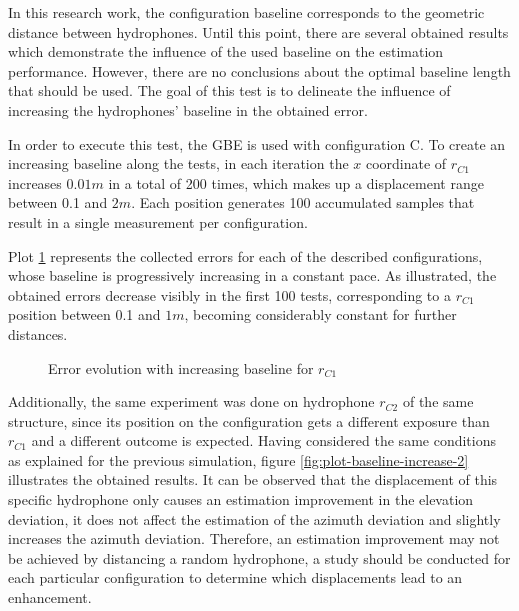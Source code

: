 In this research work, the configuration baseline corresponds to the geometric distance between hydrophones. Until this point, there are several obtained results which demonstrate the influence of the used baseline on the estimation performance. However, there are no conclusions about the optimal baseline length that should be used. The goal of this test is to delineate the influence of increasing the hydrophones' baseline in the obtained error. 

In order to execute this test, the GBE is used with configuration C. To create an increasing baseline along the tests, in each iteration the $x$ coordinate of $r_{C1}$ increases $0.01 m$ in a total of 200 times, which makes up a displacement range between 0.1 and $2 m$. Each position generates 100 accumulated samples that result in a single measurement per configuration. 

Plot \ref{fig:plot-baseline-increase-1} represents the collected errors for each of the described configurations, whose baseline is progressively increasing in a constant pace. As illustrated, the obtained errors decrease visibly in the first 100 tests, corresponding to a $r_{C1}$ position between 0.1 and $1 m$, becoming considerably constant for further distances.

\begin{figure}[!htbp]
	\captionsetup{justification=centering,margin=2cm}
	\caption{Error evolution with increasing baseline for $r_{C1}$}
	\label{fig:plot-baseline-increase-1}
\end{figure}

Additionally, the same experiment was done on hydrophone $r_{C2}$ of the same structure, since its position on the configuration gets a different exposure than $r_{C1}$ and a different outcome is expected. Having considered the same conditions as explained for the previous simulation, figure \ref{fig:plot-baseline-increase-2} illustrates the obtained results. It can be observed that the displacement of this specific hydrophone only causes an estimation improvement in the elevation deviation, it does not affect the estimation of the azimuth deviation and slightly increases the azimuth deviation. Therefore, an estimation improvement may not be achieved by distancing a random hydrophone, a study should be conducted for each particular configuration to determine which displacements lead to an enhancement.

